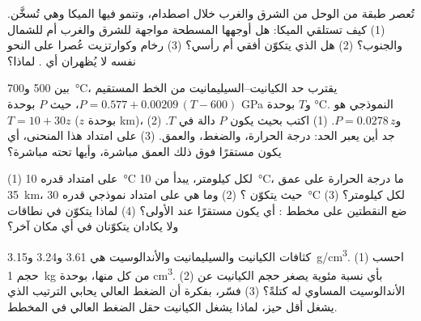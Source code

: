 \begin{exercise}[$\star\star$]\label{exo:g12:metamorphic-rocks:11}
تُعصر طبقة من الوحل من الشرق والغرب خلال اصطدام،
وتنمو فيها الميكا وهي تُسخَّن. (1) كيف تستلقي الميكا: هل أوجهها المسطحة
مواجهة للشرق والغرب أم للشمال والجنوب؟ (2) هل  الذي يتكوّن
أفقي أم رأسي؟ (3) رخام وكوارتزيت عُصرا على النحو
نفسه لا يُظهران أي . لماذا؟
\end{exercise}

\begin{exercise}[$\star\star\star$]\label{exo:g12:metamorphic-rocks:12}
بين 500 و\qty{700}{\celsius}، يقترب حد الكيانيت--السيليمانيت من
الخط المستقيم $P = 0.577 + 0.00209\,(T - 600)$، حيث $P$ بوحدة
\unit{GPa} و$T$ بوحدة \unit{\celsius}.  النموذجي هو $T = 10 + 30z$
($z$ بوحدة \unit{km})، و$P = 0.0278\,z$. (1) اكتب  بحيث يكون $P$
دالة في $T$. (2) جد أين يعبر الحد: درجة الحرارة، والضغط،
والعمق. (3) على امتداد هذا المنحنى، أي  يكون مستقرًا فوق ذلك العمق
مباشرة، وأيها تحته مباشرة؟
\end{exercise}

\begin{exercise}[$\star\star\star$]\label{exo:g12:metamorphic-rocks:13}
(1) على امتداد   قدره \qty{10}{\celsius} لكل كيلومتر، يبدأ
من \qty{10}{\celsius}، ما درجة الحرارة على عمق \qty{35}{km}، حيث
يتكوّن ؟ (2) وما هي على امتداد  نموذجي قدره
\qty{30}{\celsius} لكل كيلومتر؟ (3) ضع النقطتين على مخطط
: أي  يكون مستقرًا عند الأولى؟ (4) لماذا
يتكوّن   في نطاقات  ولا يكادان يتكوّنان في أي مكان آخر؟
\end{exercise}

\begin{exercise}[$\star\star\star$]\label{exo:g12:metamorphic-rocks:14}
كثافات الكيانيت والسيليمانيت والأندالوسيت هي \num{3.61}
و\num{3.24} و\qty{3.15}{g/cm^3}. (1) احسب حجم \qty{1}{kg} من
كل منها، بوحدة \unit{cm^3}. (2) بأي نسبة مئوية يصغر حجم الكيانيت عن
الأندالوسيت المساوي له كتلةً؟ (3) فسّر، بفكرة أن الضغط العالي
يحابي الترتيب الذي يشغل أقل حيز، لماذا يشغل الكيانيت
حقل الضغط العالي في المخطط.
\end{exercise}

